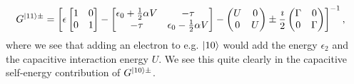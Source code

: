 \begin{align*}
G^{\ket{11}\pm} &= \left[ \epsilon \begin{bmatrix} 1 & 0 \\ 0 & 1 \end{bmatrix} - \begin{bmatrix} \epsilon_0 + \frac{1}{2} \alpha V & -\tau \\
-\tau & \epsilon_0 - \frac{1}{2} \alpha V\end{bmatrix} - \begin{pmatrix} U & 0 \\ 0 & U \end{pmatrix} \pm \frac{\imath}{2} \begin{pmatrix} \Gamma & 0 \\ 0 & \Gamma \end{pmatrix} \right]^{-1},
\end{align*}
where we see that adding an electron to e.g. $\ket{10}$ would add the energy $\epsilon_2$ and the capacitive interaction energy $U$. We see this quite clearly in the capacitive self-energy contribution of $G^{\ket{10}\pm}$. 

